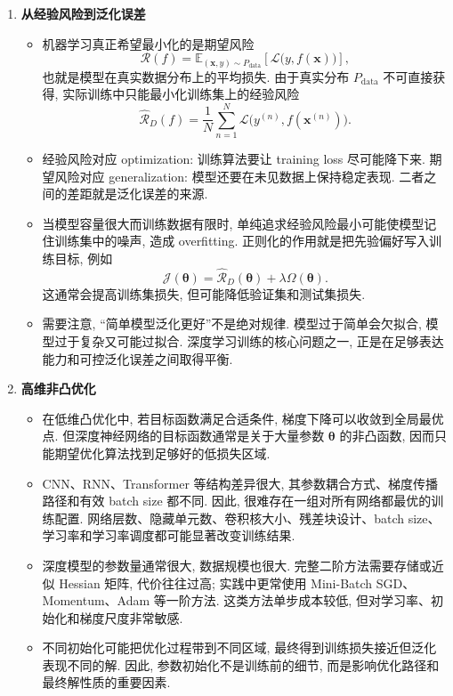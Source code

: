 \documentclass{../nndlcourse}
\begin{document}
\begin{enumerate}
  \item \textbf{从经验风险到泛化误差}
    \begin{itemize}
      \item 机器学习真正希望最小化的是期望风险
      \[
        \mathcal{R}(f)=\mathbb{E}_{(\boldsymbol{x},y)\sim P_{\mathrm{data}}}
        \left[\mathcal{L}\bigl(y,f(\boldsymbol{x})\bigr)\right],
      \]
      也就是模型在真实数据分布上的平均损失. 由于真实分布 $P_{\mathrm{data}}$ 不可直接获得, 实际训练中只能最小化训练集上的经验风险
      \[
        \hat{\mathcal{R}}_D(f)=
        \frac{1}{N}\sum_{n=1}^{N}
        \mathcal{L}\bigl(y^{(n)},f(\boldsymbol{x}^{(n)})\bigr).
      \]
      \item 经验风险对应 optimization: 训练算法要让 training loss 尽可能降下来. 期望风险对应 generalization: 模型还要在未见数据上保持稳定表现. 二者之间的差距就是泛化误差的来源.
      \item 当模型容量很大而训练数据有限时, 单纯追求经验风险最小可能使模型记住训练集中的噪声, 造成 overfitting. 正则化的作用就是把先验偏好写入训练目标, 例如
      \[
        \mathcal{J}(\boldsymbol{\theta})
        =
        \hat{\mathcal{R}}_D(\boldsymbol{\theta})
        +
        \lambda\Omega(\boldsymbol{\theta}).
      \]
      这通常会提高训练集损失, 但可能降低验证集和测试集损失.
      \item 需要注意, “简单模型泛化更好”不是绝对规律. 模型过于简单会欠拟合, 模型过于复杂又可能过拟合. 深度学习训练的核心问题之一, 正是在足够表达能力和可控泛化误差之间取得平衡.
    \end{itemize}
  \item \textbf{高维非凸优化}
    \begin{itemize}
      \item 在低维凸优化中, 若目标函数满足合适条件, 梯度下降可以收敛到全局最优点. 但深度神经网络的目标函数通常是关于大量参数 $\boldsymbol{\theta}$ 的非凸函数, 因而只能期望优化算法找到足够好的低损失区域.
      \item CNN、RNN、Transformer 等结构差异很大, 其参数耦合方式、梯度传播路径和有效 batch size 都不同. 因此, 很难存在一组对所有网络都最优的训练配置. 网络层数、隐藏单元数、卷积核大小、残差块设计、batch size、学习率和学习率调度都可能显著改变训练结果.
      \item 深度模型的参数量通常很大, 数据规模也很大. 完整二阶方法需要存储或近似 Hessian 矩阵, 代价往往过高; 实践中更常使用 Mini-Batch SGD、Momentum、Adam 等一阶方法. 这类方法单步成本较低, 但对学习率、初始化和梯度尺度非常敏感.
      \item 不同初始化可能把优化过程带到不同区域, 最终得到训练损失接近但泛化表现不同的解. 因此, 参数初始化不是训练前的细节, 而是影响优化路径和最终解性质的重要因素.

\end{itemize}
\end{enumerate}
\end{document}
